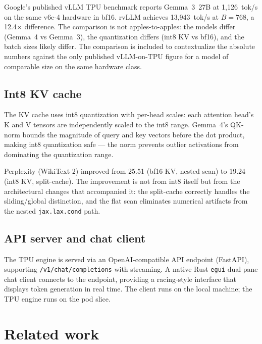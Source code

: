 Google's published vLLM TPU benchmark reports Gemma~3~27B at
1{,}126~tok/s on the same v6e-4 hardware in bf16. rvLLM achieves
13{,}943~tok/s at $B\!=\!768$, a 12.4$\times$ difference. The
comparison is not apples-to-apples: the models differ (Gemma~4 vs
Gemma~3), the quantization differs (int8 KV vs bf16), and the batch
sizes likely differ. The comparison is included to contextualize the
absolute numbers against the only published vLLM-on-TPU figure for a
model of comparable size on the same hardware class.

\subsection{Int8 KV cache}
\label{sec:tpu_int8}

The KV cache uses int8 quantization with per-head scales: each
attention head's K and V tensors are independently scaled to the int8
range. Gemma~4's QK-norm bounds the magnitude of query and key vectors
before the dot product, making int8 quantization safe --- the norm
prevents outlier activations from dominating the quantization range.

Perplexity (WikiText-2) improved from 25.51 (bf16 KV, nested scan) to
19.24 (int8 KV, split-cache). The improvement is not from int8 itself
but from the architectural changes that accompanied it: the split-cache
correctly handles the sliding/global distinction, and the flat scan
eliminates numerical artifacts from the nested \texttt{jax.lax.cond}
path.

\subsection{API server and chat client}

The TPU engine is served via an OpenAI-compatible API endpoint
(FastAPI), supporting \texttt{/v1/chat/completions} with streaming.
A native Rust \texttt{egui} dual-pane chat client connects to the
endpoint, providing a racing-style interface that displays token
generation in real time. The client runs on the local machine; the
TPU engine runs on the pod slice.

\section{Related work}
\label{sec:related}

